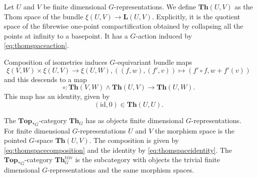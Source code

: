 \begin{mydef}
Let $U$ and $V$ be finite dimensional $G$-representations.
We define $\mathbf{Th}(U,V)$ as the Thom space of the bundle
$\xi(U,V)\to \mathbf{L}(U,V)$. Explicitly, it is the quotient space
of the fibrewise one-point compactification obtained by collapsing
all the points at infinity to a basepoint.
It has a $G$-action induced by \eqref{eq:thomspaceaction}.
\end{mydef}

Composition of isometries induces $G$-equivariant bundle maps
\[
\xi(V,W)\times \xi(U,V)\to \xi(U,W), ((f,w),(f',v))\mapsto (f'\circ f, w + f'(v))
\]
and this descends to a map
\begin{equation}\label{eq:thomspacecomposition}
\circ:\mathbf{Th}(V,W)\wedge \mathbf{Th}(U,V)\to \mathbf{Th}(U,W).
\end{equation}
This map has an identity, given by
\begin{equation}\label{eq:thomspaceidentity}
(\mathrm{id},0)\in \mathbf{Th}(U,U).
\end{equation}
\begin{mydef}
The $\mathbf{Top}_{\ast G}$-category $\mathbf{Th}_G$ has as objects
finite dimensional $G$-representations. For finite dimensional
$G$-representations $U$ and $V$ the morphism space
is the pointed $G$-space $\mathbf{Th}(U,V)$.  The composition is
given by \eqref{eq:thomspacecomposition} and the identity by \eqref{eq:thomspaceidentity}.
The $\mathbf{Top}_{\ast G}$-category $\mathbf{Th}_G^{\mathrm{triv}}$ is the subcategory
with objects the trivial finite dimensional $G$-representations and the same
morphism spaces.
\end{mydef}

